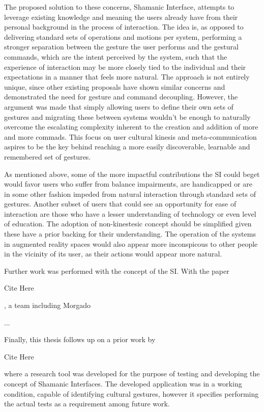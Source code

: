     The proposed solution to these concerns, Shamanic Interface, attempts to leverage existing knowledge and meaning the users already have from their personal background in the process of interaction. The idea is, as opposed to delivering standard sets of operations and motions per system, performing a stronger separation between the gesture the user performs and the gestural commands, which are the intent perceived by the system, such that the experience of interaction may be more closely tied to the individual and their expectations in a manner that feels more natural. The approach is not entirely unique, since other existing proposals have shown similar concerns and demonstrated the need for gesture and command decoupling\cite{VATAVU}. However, the argument was made that simply allowing users to define their own sets of gestures and migrating these between systems wouldn't be enough to naturally overcome the escalating complexity inherent to the creation and addition of more and more commads. This focus on user cultural kinesis and meta-communication aspires to be the key behind reaching a more easily discoverable, learnable and remembered set of gestures.
    
    As mentioned above, some of the more impactful contributions the SI could beget would favor users who suffer from balance impairments, are handicapped or are in some other fashion impeded from natural interaction through standard sets of gestures. Another subset of users that could see an opportunity for ease of interaction are those who have a lesser understanding of technology or even level of education. The adoption of non-kinestesic concept should be simplified given these have a prior backing for their understanding. The operation of the systems in augmented reality spaces would also appear more inconspicous to other people in the vicinity of its user, as their actions would appear more natural.
    
    Further work was performed with the concept of the SI. With the paper \begin{dummied}Cite Here\end{dummied}, a team including Morgado\begin{dummied}...\end{dummied} Finally, this thesis follows up on a prior work by \begin{dummied}Cite Here\end{dummied} where a research tool was developed for the purpose of testing and developing the concept of Shamanic Interfaces. The developed application was in a working condition, capable of identifying cultural gestures, however it specifies performing the actual tests as a requirement among future work.  


